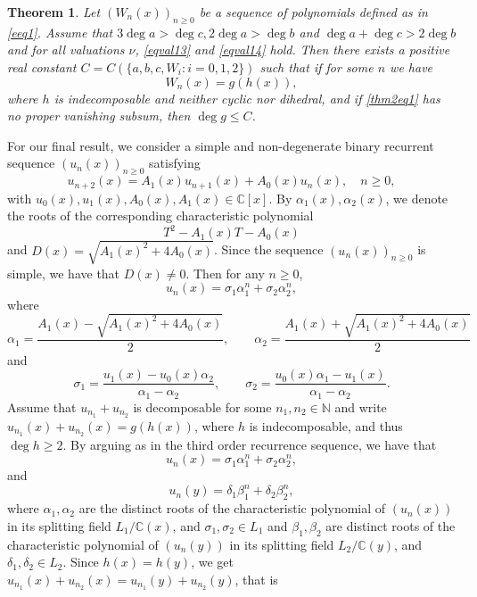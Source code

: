 \documentclass[12pt]{amsart}
\newtheorem{theorem}{Theorem}[section]
\newcommand{\N}{\mbox{$\mathbb N$}}     %
\newcommand{\C}{\mbox{$\mathbb C$}}     %
\begin{document}
\begin{theorem}\label{2thm}
    Let $(W_n(x))_{n\geq0}$ be a sequence of polynomials defined as in \eqref{eeq1}. Assume that $3\deg a>\deg c, 2\deg a>\deg b$ and $\deg a+\deg c>2\deg b$ and for all valuations $\nu$, \eqref{eqval13} and \eqref{eqval14} hold. Then there exists a positive real constant $C=C(\{a,b,c,W_i: i=0,1,2\})$ such that if for some $n$ we have 
     \[W_n(x)=g(h(x)),\]
     where $h$ is indecomposable and neither cyclic nor dihedral, and if \eqref{thm2eq1} has no proper vanishing subsum, then $\deg g \leq C$.
\end{theorem}



For our final result, we consider a simple and non-degenerate binary recurrent sequence $(u_n(x))_{n\geq0}$ satisfying
\begin{equation}\label{eq2.21}
		u_{n+2}(x)=A_1(x)u_{n+1}(x)+A_0(x)u_n(x), \quad n\geq 0,
\end{equation} with $u_0(x),u_1(x),A_0(x),A_1(x)\in \C[x]$. By $\alpha_1(x), \alpha_2(x)$, we denote the roots of the corresponding characteristic polynomial
\[T^2-A_1(x)T-A_0(x)\]
and $D(x) = \sqrt{A_1(x)^2+4A_0(x)}$. Since the sequence $(u_n(x))_{n\geq 0}$ is simple, we have that $D(x)\neq 0$. Then for any $n\geq0$,
\begin{equation}\label{eq5.9}
		u_n(x)=\sigma_1\alpha_1^n+\sigma_2\alpha_2^n,
\end{equation}
where 
\begin{equation*}\label{eq23}
\alpha_1 = \frac{A_1(x) - \sqrt{A_1(x)^2 + 4A_0(x)}}{2}, \qquad
\alpha_2 = \frac{A_1(x) + \sqrt{A_1(x)^2 + 4A_0(x)}}{2}
\end{equation*} and 
\begin{equation*}\label{eq23a}
    \sigma_1= \frac{u_{1}(x)-u_{0}(x)\alpha_{2}}{\alpha_{1}-\alpha_{2}}, \qquad  \sigma_2= \frac{u_{0}(x)\alpha_1-u_{1}(x)}{\alpha_{1}-\alpha_{2}}.
\end{equation*} 
Assume that $u_{n_1}+u_{n_2}$ is decomposable for some $n_1,n_2\in \N$ and write $u_{n_1}(x)+u_{n_2}(x)=g(h(x))$, where $h$ is indecomposable, and thus $\deg h\geq 2$. By arguing as in the third order recurrence sequence, we have that
\begin{equation*}
u_n(x)=\sigma_1\alpha_1^n+\sigma_2\alpha_2^n,
\end{equation*} and 
\begin{equation*}
u_n(y)=\delta_1\beta_1^n+\delta_2\beta_2^n,
\end{equation*}
where $\alpha_1, \alpha_2$ are the distinct roots of the characteristic polynomial of $(u_n(x))$ in its splitting field $L_1/\C(x)$, and $\sigma_1,\sigma_2 \in L_1$ and $\beta_1, \beta_2$ are distinct roots of the characteristic polynomial of $(u_n(y))$ in its splitting field $L_2/\C(y)$, and $\delta_1, \delta_2\in L_2$. Since $h(x)=h(y)$, we get $u_{n_1}(x)+u_{n_2}(x)=u_{n_1}(y)+u_{n_2}(y)$, that is
\end{document}
